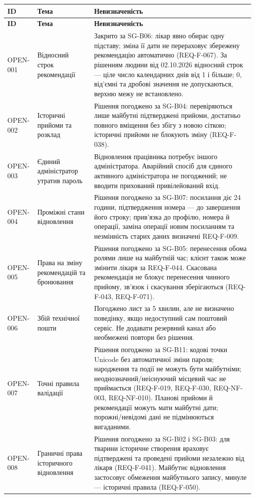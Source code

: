 \documentclass[11pt,a4paper]{article}
\begin{document}
\begin{longtable}{>{\raggedright\arraybackslash}p{2.4cm} >{\raggedright\arraybackslash}p{3.2cm} >{\raggedright\arraybackslash}p{9.6cm}}
\toprule
\textbf{ID} & \textbf{Тема} & \textbf{Невизначеність} \\ \midrule
\endfirsthead
\toprule
\textbf{ID} & \textbf{Тема} & \textbf{Невизначеність} \\ \midrule
\endhead
\bottomrule
\endfoot
OPEN-001 & Відносний строк рекомендації & Закрито за SG-B06: лікар явно обирає одну підставу; зміна її дати не перераховує збережену рекомендацію автоматично (REQ-F-067). За рішенням людини від 02.10.2026 відносний строк — ціле число календарних днів від 1 і більше; 0, від’ємні та дробові значення не допускаються, верхню межу не встановлено. \\
OPEN-002 & Історичні прийоми та розклад & Рішення погоджено за SG-B04: перевіряються лише майбутні підтверджені прийоми, достатньо повного вміщення без збігу з новою сіткою; історичні прийоми не блокують зміну (REQ-F-038). \\
OPEN-003 & Єдиний адміністратор утратив пароль & Відновлення працівника потребує іншого адміністратора. Аварійний спосіб для єдиного активного адміністратора не погоджений; не вводити прихований привілейований вхід. \\
OPEN-004 & Проміжні стани відновлення & Рішення погоджено за SG-B07: посилання діє 24 години, підтвердження номера — до завершення його строку; прив’язка до профілю, номера й операції, заміна операції новим посиланням та незмінність старих даних визначені REQ-F-009. \\
OPEN-005 & Права на зміну рекомендацій та бронювання & Рішення погоджено за SG-B05: перенесення обома ролями лише на майбутній час; клієнт також може змінити лікаря за REQ-F-044. Скасована рекомендація не блокує перенесення чинного прийому, зв’язок і скасування зберігаються (REQ-F-043, REQ-F-071). \\
OPEN-006 & Збій технічної пошти & Погоджено лист за 5 хвилин, але не визначено поведінку, якщо недоступний сам поштовий сервіс. Не додавати резервний канал або необмежені повтори без рішення. \\
OPEN-007 & Точні правила валідації & Рішення погоджено за SG-B11: кодові точки Unicode без автоматичної зміни пароля; народження та події не можуть бути майбутніми; неоднозначний/неіснуючий місцевий час не приймається (REQ-F-019, REQ-F-030, REQ-NF-003, REQ-NF-010). Планові прийоми й рекомендації можуть мати майбутні дати; порожні/невідомі дані не підмінюються вигаданими. \\
OPEN-008 & Граничні права історичного відновлення & Рішення погоджено за SG-B02 і SG-B03: для тварини історичне створення враховує підтверджені та проведені прийоми незалежно від лікаря (REQ-F-041). Майбутнє відновлення застосовує обмеження майбутнього запису, минуле — історичні правила (REQ-F-050). \\
\end{longtable}
\end{document}
